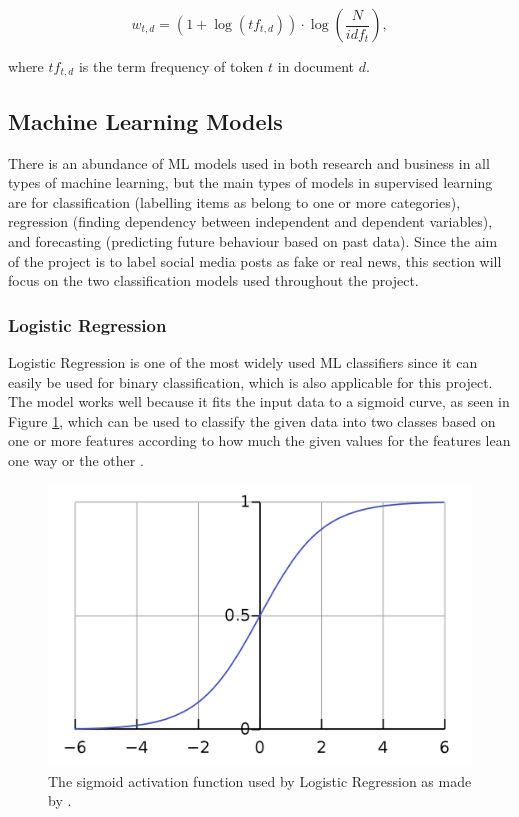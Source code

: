 \documentclass{l4proj}
\begin{document}
\[w_{t,d} = (1 + \log{(tf_{t,d})}) \cdot \log{(\frac{N}{idf_t})},\]

where $tf_{t,d}$ is the term frequency of token $t$ in document $d$.


\subsection{Machine Learning Models}

There is an abundance of ML models used in both research and business in all types of machine learning, but the main types of models in supervised learning are for classification (labelling items as belong to one or more categories), regression (finding dependency between independent and dependent variables), and forecasting (predicting future behaviour based on past data). Since the aim of the project is to label social media posts as fake or real news, this section will focus on the two classification models used throughout the project.

\subsubsection{Logistic Regression}

Logistic Regression is one of the most widely used ML classifiers since it can easily be used for binary classification, which is also applicable for this project. The model works well because it fits the input data to a sigmoid curve, as seen in Figure \ref{fig:LRSigmoid}, which can be used to classify the given data into two classes based on one or more features according to how much the given values for the features lean one way or the other \citep{LogRegression}.

\begin{figure}
    \centering
    \includegraphics[width=0.5\linewidth]{images/Background/sigmoid.png}    

    \caption{The sigmoid activation function used by Logistic Regression as made by \citet{LRSigmoid}.}
    \label{fig:LRSigmoid} 
\end{figure}
\end{document}
